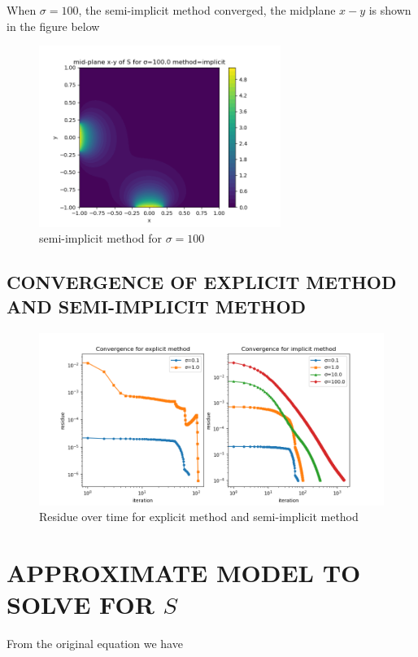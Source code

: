 When $\sigma = 100$, the semi-implicit method converged, the midplane $x-y$ is shown in the figure below

\begin{figure}[H]
	\caption{semi-implicit method for $\sigma = 100$}
	\centering
	\includegraphics[width=0.7\textwidth]{i_100}
\end{figure}

\subsection{CONVERGENCE OF EXPLICIT METHOD AND SEMI-IMPLICIT METHOD}

\begin{figure}[H]
	\caption{Residue over time for explicit method and semi-implicit method}
	\centering
	\includegraphics[width=1.0\textwidth]{convergence}
\end{figure}


\section{APPROXIMATE MODEL TO SOLVE FOR $S$}

From the original equation we have

